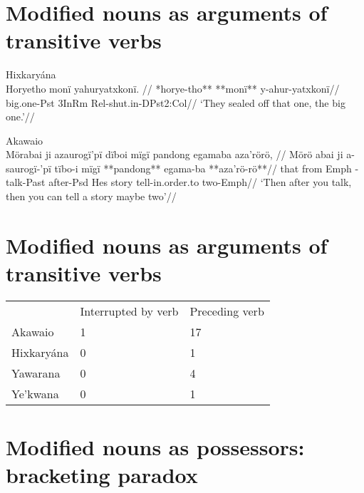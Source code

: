 \documentclass[10pt]{article}
\begin{document}
\section{Modified nouns as arguments of transitive verbs}

\ex Hixkaryána \parencite[60]{derbyshire1965textos} \\
\label{derbyshire-1965-p-060-the-wives-of-mawarye-and-woxka-005}    \begingl
    \glpreamble Horyetho monï yahuryatxkonï. //
    \gla **horye-tho** **monï** y-ahur-yatxkonï//
    \glb big.one-Pst 3InRm Rel-shut.in-DPst2:Col//
        \glft ‘They sealed off that one, the big one.’//  
    \endgl 
\xe

\ex Akawaio \parencite{akawaiocaesar2003} \\
\label{pingkas-personal-narrative-005-interviewer}    \begingl
    \glpreamble Mörabai ji azaurogï'pï dïboi mïgï pandong egamaba aza'rörö, //
    \gla Mörö abai ji a-saurogï-'pï tïbo-i mïgï **pandong** egama-ba **aza'rö-rö**//
    \glb that from Emph -talk-Past after-Psd Hes story tell-in.order.to two-Emph//
        \glft ‘Then after you talk, then you can tell a story maybe two’//  
    \endgl 
\xe


\section{Modified nouns as arguments of transitive verbs}\begin{tabular}[t]{lll}

           & Interrupted by verb & Preceding verb \\

   Akawaio &                   1 &             17 \\
Hixkaryána &                   0 &              1 \\
  Yawarana &                   0 &              4 \\
  Ye'kwana &                   0 &              1 \\

\end{tabular}

\section{Modified nouns as possessors: bracketing paradox}
\end{document}
